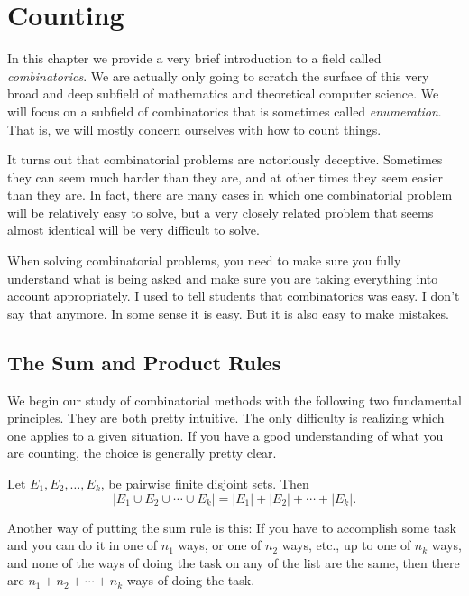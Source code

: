 \chapter{Counting}\label{ch:count}
In this chapter we provide a very brief introduction to a field called {\em combinatorics}.
We are actually only going to scratch the surface of this very broad and deep subfield
of mathematics and theoretical computer science.  We will focus on a subfield of
combinatorics that is sometimes called {\em enumeration}.  That is, we will mostly 
concern ourselves with how to count things.

It turns out that combinatorial problems are notoriously deceptive.
Sometimes they can seem much harder than they are, and at other times they seem easier than
they are.  In fact, there are many cases in which one combinatorial problem will be relatively
easy to solve, but a very closely related problem that seems almost identical will be 
very difficult to solve.

When solving combinatorial problems, you need to make sure you fully understand what is 
being asked and make sure you are taking everything into account appropriately.
I used to tell students that combinatorics was easy.  I don't say that anymore.  In some
sense it is easy.  But it is also easy to make mistakes.

\section{The Sum and Product Rules}\label{sec:multSum}
We begin our study of combinatorial methods with the following two
fundamental principles.  They are both pretty intuitive.  The only difficulty
is realizing which one applies to a given situation.  If you have a good
understanding of what you are counting, the choice is generally pretty clear.

\begin{thm} 
\label{rul:sum}Let $E_1, E_2, \ldots, E_k$, be pairwise finite disjoint sets. Then
$$|E_1 \cup E_2 \cup \cdots \cup E_k| = |E_1| + |E_2| + \cdots + |E_k|.$$

Another way of putting the sum rule is this:  
If you have to accomplish some task and you can do it in one of $n_1$ ways, or
one of $n_2$ ways, etc., up to one of $n_k$ ways, and none of the ways of doing the
task on any of the list are the same, then there are
$n_1+n_2+\cdots+n_k$ ways of doing the task.
\end{thm}


